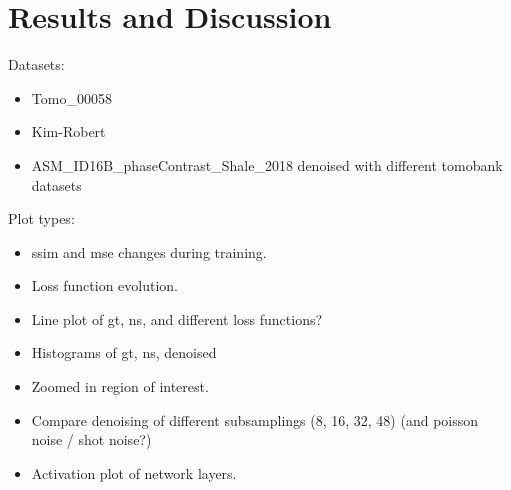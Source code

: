 \chapter{Results and Discussion}
\label{sec:results}

Datasets:
\begin{itemize}
    \item Tomo\_00058
    \item Kim-Robert
    \item ASM\_ID16B\_phaseContrast\_Shale\_2018 denoised with different tomobank datasets
\end{itemize}

Plot types: 
\begin{itemize}
    \item \acrshort{ssim} and \acrshort{mse} changes during training.
    \item Loss function evolution.
    \item Line plot of gt, ns, and different loss functions?
    \item Histograms of gt, ns, denoised
    \item Zoomed in region of interest.
    \item Compare denoising of different subsamplings (8, 16, 32, 48) (and poisson noise / shot noise?)
    \item Activation plot of network layers.
\end{itemize}